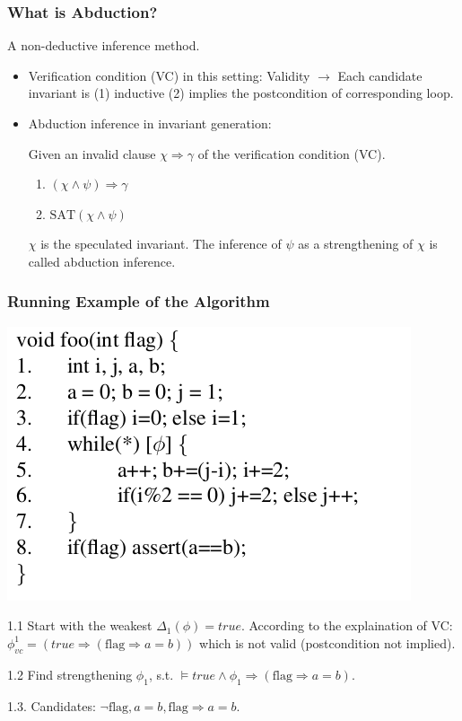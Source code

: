 \documentclass[11pt]{beamer}
\begin{document}
\begin{frame}\frametitle{What is Abduction?}

A non-deductive inference method.

\begin{itemize}
\item 
Verification condition (VC) in this setting: 
Validity $\longrightarrow$
Each candidate invariant is (1) inductive (2) implies the postcondition of corresponding loop.


\item Abduction inference in invariant generation:

Given an invalid clause $\chi\Rightarrow \gamma$ of the verification condition (VC).
\begin{enumerate}
\item $(\chi\wedge \psi )\Rightarrow \gamma$

\item $\text{SAT}(\chi\wedge \psi)$
\end{enumerate}

$\chi$ is the speculated invariant. The inference of $\psi$ as a strengthening of $\chi$ is called abduction inference.

\end{itemize}

\end{frame}

\begin{frame}\frametitle{Running Example of the Algorithm}
\begin{center}
\includegraphics[scale=0.4]{exp.png}
\end{center}

1.1 Start with the weakest $\Delta_1(\phi) = true$. According to the explaination of VC: $\phi_{vc}^1 = (true\Rightarrow (\text{flag}\Rightarrow a = b))$ which is not valid (postcondition not implied).

1.2 Find strengthening $\phi_1$, s.t. $\models true\wedge \phi_1 \Rightarrow (\text{flag}\Rightarrow a = b)$.

1.3. Candidates: $\neg \text{flag}, a = b, \text{flag}\Rightarrow a = b$.

\end{frame}
\end{document}
